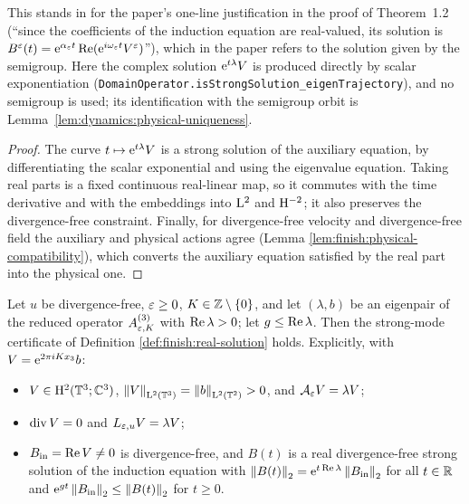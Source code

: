 This stands in for the paper's one-line justification in the proof of Theorem~1.2 (``since
the coefficients of the induction equation are real-valued, its solution is
$B^\varepsilon(t)=\mathrm{e}^{\alpha_\varepsilon t}\operatorname{Re}(\mathrm{e}^{i\omega_\varepsilon t}V^\varepsilon)$''), which in the paper refers to
the solution given by the semigroup.  Here the complex solution $\mathrm{e}^{t\lambda}V$ is produced directly by scalar
exponentiation (\texttt{DomainOperator.isStrongSolution\_eigenTrajectory}), and no semigroup is
used; its identification with the semigroup orbit is
Lemma~\ref{lem:dynamics:physical-uniqueness}.

\begin{proof}
  \leanok
  The curve $t\mapsto\mathrm{e}^{t\lambda}V$ is a strong solution of the auxiliary equation, by
  differentiating the scalar exponential and using the eigenvalue equation.  Taking real parts is a
  fixed continuous real-linear map, so it commutes with the time derivative and with the embeddings
  into $\mathrm{L}^2$ and $\mathrm{H}^{-2}$; it also preserves the divergence-free constraint.  Finally, for
  divergence-free velocity and divergence-free field the auxiliary and physical actions agree
  (Lemma \ref{lem:finish:physical-compatibility}), which converts the auxiliary equation satisfied
  by the real part into the physical one.
\end{proof}

\begin{proposition}
  \label{prop:finish:real-strong-mode}
  \leanok
  Let $u$ be divergence-free, $\varepsilon\geq0$, $K\in\mathbb{Z}\setminus\{0\}$, and let $(\lambda,b)$ be an
  eigenpair of the reduced operator $A^{(3)}_{\varepsilon,K}$ with $\operatorname{Re}\lambda>0$; let
  $g\leq\operatorname{Re}\lambda$.  Then
  the strong-mode certificate of Definition \ref{def:finish:real-solution} holds.  Explicitly, with
  $V=\mathrm{e}^{2\pi iKx_3}b$:
  \begin{itemize}
    \item $V\in\mathrm{H}^2(\mathbb{T}^3;\mathbb{C}^3)$, $\left\|V\right\|_{\mathrm{L}^2(\mathbb{T}^3)}=\left\|b\right\|_{\mathrm{L}^2(\mathbb{T}^2)}>0$, and
      $\mathcal{A}_\varepsilon V=\lambda V$;
    \item $\operatorname{div} V=0$ and $L_{\varepsilon,u}V=\lambda V$;
    \item $B_{\rm in}=\operatorname{Re} V\neq0$ is divergence-free, and $B(t)$ is a real divergence-free strong
      solution of the induction equation with $\left\|B(t)\right\|_2=\mathrm{e}^{t\operatorname{Re}\lambda}\left\|B_{\rm in}\right\|_2$
      for all $t\in\mathbb{R}$ and $\mathrm{e}^{gt}\left\|B_{\rm in}\right\|_2\leq\left\|B(t)\right\|_2$ for $t\geq0$.
  \end{itemize}
\end{proposition}


